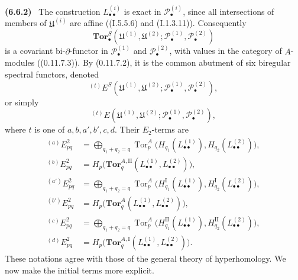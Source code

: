 \documentclass[10pt,oneside]{book}
\newcommand{\sh}[1]{\mathscr{#1}}
\newcommand{\Tor}{\operatorname{Tor}}
\newcommand{\sref}[2][]{(#2)}
\newcommand{\oldpage}[2][]{\setcounter{footnote}{0}\marginpar{\scriptsize\textbf{#1}~|~#2}\ignorespaces}
\newenvironment{env}[1][]{\par\medskip\noindent\textbf{(#1)}\ }{\par}
\begin{document}
\begin{env}[6.6.2]
The construction $L_{\bullet\bullet}^{(i)}$ is exact in
$\sh P_\bullet^{(i)}$, since all intersections of members of
\oldpage[III]{154}
$\mathfrak U^{(i)}$ are affine
(\sref[I]{I.5.5.6} and \sref[I]{I.1.3.11}).  Consequently
\[
  \mathbf{Tor}_\bullet^S
  (\mathfrak U^{(1)},\mathfrak U^{(2)};
   \sh P_\bullet^{(1)},\sh P_\bullet^{(2)})
\]
is a covariant bi-$\partial$-functor in
$\sh P_\bullet^{(1)}$ and $\sh P_\bullet^{(2)}$, with values in
the category of $A$-modules (\sref[0]{0.11.7.3}).  By
\sref[0]{0.11.7.2}, it is the common abutment of six biregular
spectral functors, denoted
\[
  {}^{(t)}E^S
  (\mathfrak U^{(1)},\mathfrak U^{(2)};
   \sh P_\bullet^{(1)},\sh P_\bullet^{(2)}),
\]
or simply
\[
  {}^{(t)}E
  (\mathfrak U^{(1)},\mathfrak U^{(2)};
   \sh P_\bullet^{(1)},\sh P_\bullet^{(2)}),
\]
where $t$ is one of $a,b,a',b',c,d$.  Their $E_2$-terms are
\[
\begin{aligned}
  {}^{(a)}E_{pq}^2
  &=
  \bigoplus_{q_1+q_2=q}
  \Tor_p^A
  \bigl(H_{q_1}(L_{\bullet\bullet}^{(1)}),
        H_{q_2}(L_{\bullet\bullet}^{(2)})\bigr),\\
  {}^{(b)}E_{pq}^2
  &=
  H_p\bigl(
    \mathbf{Tor}_q^{A,\mathrm{II}}
    (L_{\bullet\bullet}^{(1)},L_{\bullet\bullet}^{(2)})
  \bigr),\\
  {}^{(a')}E_{pq}^2
  &=
  \bigoplus_{q_1+q_2=q}
  \Tor_p^A
  \bigl(H_{q_1}^{\mathrm I}(L_{\bullet\bullet}^{(1)}),
        H_{q_2}^{\mathrm I}(L_{\bullet\bullet}^{(2)})\bigr),\\
  {}^{(b')}E_{pq}^2
  &=
  H_p\bigl(
    \mathbf{Tor}_q^A
    (L_{\bullet\bullet}^{(1)},L_{\bullet\bullet}^{(2)})
  \bigr),\\
  {}^{(c)}E_{pq}^2
  &=
  \bigoplus_{q_1+q_2=q}
  \Tor_p^A
  \bigl(H_{q_1}^{\mathrm{II}}(L_{\bullet\bullet}^{(1)}),
        H_{q_2}^{\mathrm{II}}(L_{\bullet\bullet}^{(2)})\bigr),\\
  {}^{(d)}E_{pq}^2
  &=
  H_p\bigl(
    \mathbf{Tor}_q^{A,\mathrm I}
    (L_{\bullet\bullet}^{(1)},L_{\bullet\bullet}^{(2)})
  \bigr).
\end{aligned}
\]
These notations agree with those of the general theory of
hyperhomology.  We now make the initial terms more explicit.
\end{env}
\end{document}
